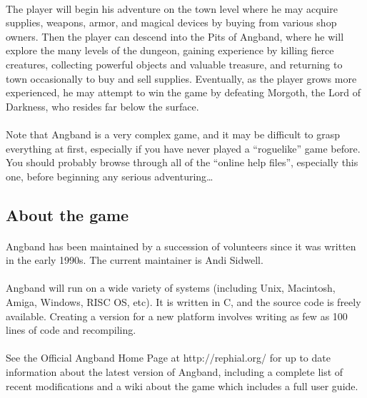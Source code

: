 \paragraph{}The player will begin his adventure on the town level where he may
acquire supplies, weapons, armor, and magical devices by buying from
various shop owners. Then the player can descend into the Pits of
Angband, where he will explore the many levels of the dungeon, gaining
experience by killing fierce creatures, collecting powerful objects and
valuable treasure, and returning to town occasionally to buy and sell
supplies. Eventually, as the player grows more experienced, he may
attempt to win the game by defeating Morgoth, the Lord of Darkness, who
resides far below the surface.

\paragraph{}Note that Angband is a very complex game, and it may be difficult to
grasp everything at first, especially if you have never played a
``roguelike'' game before. You should probably browse through all of the
``online help files'', especially this one, before beginning any serious
adventuring\ldots

\subsection{About the game}
\paragraph{}Angband has been maintained by a succession of volunteers since it was
written in the early 1990s. The current maintainer is Andi Sidwell.

\paragraph{}Angband will run on a wide variety of systems (including Unix,
Macintosh, Amiga, Windows, RISC OS, etc). It is written in C, and the
source code is freely available. Creating a version for a new platform
involves writing as few as 100 lines of code and recompiling.

\paragraph{}See the Official Angband Home Page at http://rephial.org/ for up to date
information about the latest version of Angband, including a complete
list of recent modifications and a wiki about the game which includes a
full user guide.

